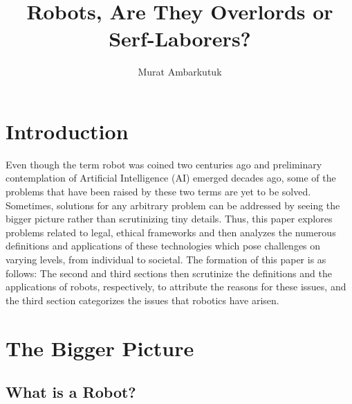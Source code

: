 \documentclass[man]{apa6}
\title{Robots, Are They Overlords or Serf-Laborers?}
\author{Murat Ambarkutuk}
\affiliation{English Language Institute, University of Delaware \\ murata@udel.
edu}
\begin{document}
\maketitle

\section{Introduction}
Even though the term robot was coined two centuries ago and preliminary contemplation of Artificial Intelligence (AI) emerged decades ago, some of the problems that have been raised by these two terms are yet to be solved.
Sometimes, solutions for any arbitrary problem can be addressed by seeing the bigger picture rather than scrutinizing tiny details.
Thus, this paper explores problems related to legal, ethical frameworks and then analyzes the numerous definitions and applications of these technologies which pose challenges on varying levels, from individual to societal.
The formation of this paper is as follows: The second and third sections then scrutinize the definitions and the applications of robots, respectively, to attribute the reasons for these issues, and the third section categorizes the issues that robotics have arisen.

\section{The Bigger Picture}
\subsection{What is a Robot?}
\par
\end{document}
